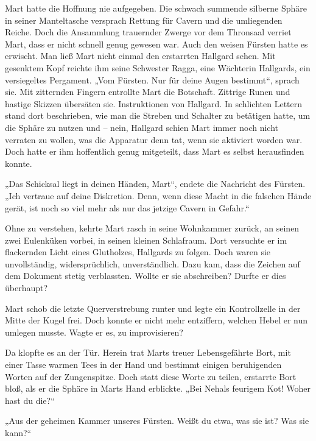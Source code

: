 Mart hatte die Hoffnung nie aufgegeben. Die schwach summende silberne Sphäre in seiner Manteltasche versprach Rettung für Cavern und die umliegenden Reiche. Doch die Ansammlung trauernder Zwerge vor dem Thronsaal verriet Mart, dass er nicht schnell genug gewesen war. Auch den weisen Fürsten hatte es erwischt. Man ließ Mart nicht einmal den erstarrten Hallgard sehen. Mit gesenktem Kopf reichte ihm seine Schwester Ragga, eine Wächterin Hallgards, ein versiegeltes Pergament. „Vom Fürsten. Nur für deine Augen bestimmt“, sprach sie. Mit zitternden Fingern entrollte Mart die Botschaft. Zittrige Runen und hastige Skizzen übersäten sie. Instruktionen von Hallgard. In schlichten Lettern stand dort beschrieben, wie man die Streben und Schalter zu betätigen hatte, um die Sphäre zu nutzen und – nein, Hallgard schien Mart immer noch nicht verraten zu wollen, was die Apparatur denn tat, wenn sie aktiviert worden war. Doch hatte er ihm hoffentlich genug mitgeteilt, dass Mart es selbst herausfinden konnte. 

„Das Schicksal liegt in deinen Händen, Mart“, endete die Nachricht des Fürsten. „Ich vertraue auf deine Diskretion. Denn, wenn diese Macht in die falschen Hände gerät, ist noch so viel mehr als nur das jetzige Cavern in Gefahr.“



\trennzeichen



Ohne zu verstehen, kehrte Mart rasch in seine Wohnkammer zurück, an seinen zwei Eulenküken vorbei, in seinen kleinen Schlafraum. Dort versuchte er im flackernden Licht eines Glutholzes, Hallgards zu folgen. Doch waren sie unvollständig, widersprüchlich, unverständlich. Dazu kam, dass die Zeichen auf dem Dokument stetig verblassten. Wollte er sie abschreiben? Durfte er dies überhaupt?

Mart schob die letzte Querverstrebung runter und legte ein Kontrollzelle in der Mitte der Kugel frei. Doch konnte er nicht mehr entziffern, welchen Hebel er nun umlegen musste. Wagte er es, zu improvisieren?

Da klopfte es an der Tür. Herein trat Marts treuer Lebensgefährte Bort, mit einer Tasse warmen Tees in der Hand und bestimmt einigen beruhigenden Worten auf der Zungenspitze. Doch statt diese Worte zu teilen, erstarrte Bort bloß, als er die Sphäre in Marts Hand erblickte.
„Bei Nehals feurigem Kot! Woher hast du die?“

„Aus der geheimen Kammer unseres Fürsten. Weißt du etwa, was sie ist? Was sie kann?“

